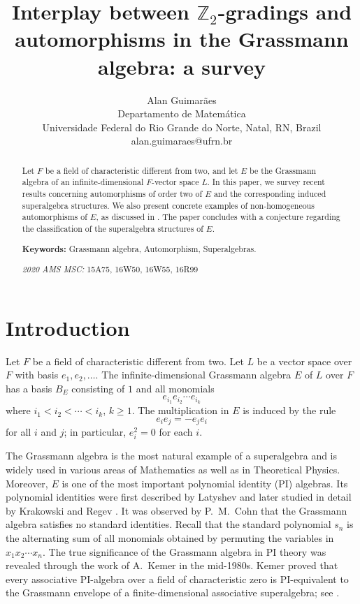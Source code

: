 \documentclass{article}
\title{Interplay between $\mathbb{Z}_2$-gradings and automorphisms in the Grassmann algebra: a survey
}
\author{
	Alan Guimar\~aes\\
	Departamento de Matemática\\
	Universidade Federal do Rio Grande do Norte, Natal, RN, Brazil\\
	alan.guimaraes@ufrn.br }
\begin{document}
	\maketitle
	
	\begin{abstract} 
		
		Let $F$ be a field of characteristic different from two, and let $E$ be the Grassmann algebra of an infinite-dimensional $F$-vector space $L$. In this paper, we survey recent results concerning automorphisms of order two of $E$ and the corresponding induced superalgebra structures. We also present concrete examples of non-homogeneous automorphisms of $E$, as discussed in \cite{agpkauto, anagomes}. The paper concludes with a conjecture regarding the classification of the superalgebra structures of $E$.
		
		
		
		
		
		\noindent \textbf{Keywords:} Grassmann algebra, Automorphism, Superalgebras.
		
		\vspace{0.5cm}
		\noindent \textit{2020 AMS MSC:} 15A75, 16W50, 16W55, 16R99
		
	\end{abstract}
	
	
	
	\section{Introduction}
	
	Let $F$ be a field of characteristic different from two. Let $L$ be a vector space over $F$ with basis $e_1, e_2, \ldots$. The infinite-dimensional Grassmann algebra $E$ of $L$ over $F$ has a basis $B_E$ consisting of $1$ and all monomials 
	\[
	e_{i_1} e_{i_2} \cdots e_{i_k}
	\]
	where $i_1 < i_2 < \cdots < i_k$, $k \geq 1$. The multiplication in $E$ is induced by the rule
	\[
	e_i e_j = - e_j e_i
	\]
	for all $i$ and $j$; in particular, $e_i^2 = 0$ for each $i$.
	
	The Grassmann algebra is the most natural example of a superalgebra and is widely used in various areas of Mathematics as well as in Theoretical Physics. Moreover, $E$ is one of the most important polynomial identity (PI) algebras. Its polynomial identities were first described by Latyshev \cite{latyshev} and later studied in detail by Krakowski and Regev \cite{KR}. It was observed by P.~M.~Cohn that the Grassmann algebra satisfies no standard identities. Recall that the standard polynomial $s_n$ is the alternating sum of all monomials obtained by permuting the variables in $x_1 x_2 \cdots x_n$. The true significance of the Grassmann algebra in PI theory was revealed through the work of A.~Kemer in the mid-1980s. Kemer proved that every associative PI-algebra over a field of characteristic zero is PI-equivalent to the Grassmann envelope of a finite-dimensional associative superalgebra; see \cite{Kemer1, Kemer2}.
	
\end{document}

